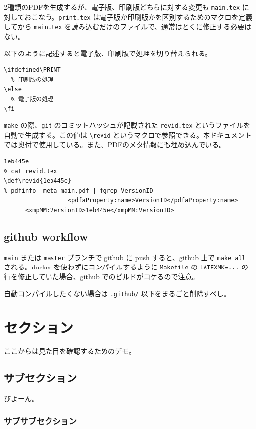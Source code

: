 2種類のPDFを生成するが、電子版、印刷版どちらに対する変更も \verb`main.tex` に対しておこなう。\verb`print.tex` は電子版か印刷版かを区別するためのマクロを定義してから \verb`main.tex` を読み込むだけのファイルで、通常はとくに修正する必要はない。

以下のように記述すると電子版、印刷版で処理を切り替えられる。

\begin{lstlisting}
\ifdefined\PRINT
  % 印刷版の処理
\else
  % 電子版の処理
\fi
\end{lstlisting}

\verb`make` の際、\verb`git` のコミットハッシュが記載された \verb`revid.tex` というファイルを自動で生成する。この値は \verb`\revid` というマクロで参照できる。本ドキュメントでは奥付で使用している。また、PDFのメタ情報にも埋め込んでいる。

\begin{lstlisting}[style=tty]
% git rev-parse --short main
1eb445e
% cat revid.tex
\def\revid{1eb445e}
% pdfinfo -meta main.pdf | fgrep VersionID
                  <pdfaProperty:name>VersionID</pdfaProperty:name>
      <xmpMM:VersionID>1eb445e</xmpMM:VersionID>
\end{lstlisting}

\subsection{github workflow}

\verb`main` または \verb`master` ブランチで github に push すると、github 上で \verb`make all` される。docker を使わずにコンパイルするように \verb`Makefile` の \verb`LATEXMK=...` の行を修正していた場合、github でのビルドがコケるので注意。

自動コンパイルしたくない場合は \verb`.github/` 以下をまるごと削除すべし。

\section{セクション}

ここからは見た目を確認するためのデモ。

\subsection{サブセクション}

びよーん。

\subsubsection{サブサブセクション}

